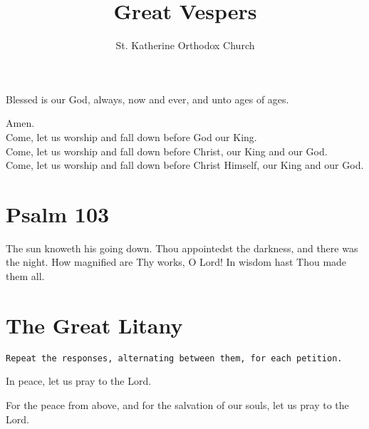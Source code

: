 \documentclass[twoside, letterpaper, 12pt]{report}
\newcommand{\instruction}[1]{%
  \texttt{\scriptsize{#1}}%
}
\newcommand{\centeredsection}[1]{%
  \section*{\centering{}#1}%
}
\begin{document}

\title{Great Vespers}
\author{St. Katherine Orthodox Church}
\date{}%
\maketitle


\begin{priest}
\item Blessed is our God, always, now and ever, and unto ages of ages.
\end{priest}

\begin{reader}
\item Amen.\\
    Come, let us worship and fall down before God our King.\\
    Come, let us worship and fall down before Christ, our King and our God.\\
    Come, let us worship and fall down before Christ Himself, our King and our God.\\
\end{reader}

\centeredsection{Psalm 103}
\begin{multicols}{2}


The sun knoweth his going down.
Thou appointedst the darkness, and there was the night.
How magnified are Thy works, O Lord! In wisdom hast Thou made them all.
\end{multicols}


\centeredsection{The Great Litany}
\instruction{Repeat the responses, alternating between them, for each petition.}
\begin{deacon}
\item In peace, let us pray to the Lord.
\end{deacon}

\begin{deacon}
\item For the peace from above, and for the salvation of our souls,
    let us pray to the Lord.
\end{deacon}
\end{document}
